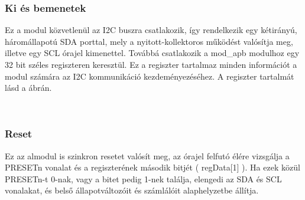 \subsubsection{Ki és bemenetek}
    Ez a modul közvetlenül az I2C buszra csatlakozik, így rendelkezik egy kétirányú, háromállapotú SDA porttal, mely a nyitott-kollektoros működést valósítja meg, illetve egy SCL órajel kimenettel. Továbbá csatlakozik a mod\_apb modulhoz egy 32 bit széles regiszteren keresztül. Ez a regiszter tartalmaz minden információt a modul számára az I2C kommunikáció kezdeményezéséhez. A regiszter tartalmát lásd a  ábrán.
    \begin{figure}[ht!]
        \centering
        \\[2ex]
        \caption{}
        \label{fig:reg}
    \end{figure}

\subsubsection{Reset}
    Ez az almodul is szinkron resetet valósít meg, az órajel felfutó élére vizsgálja a PRESETn vonalat és a regiszterének második bitjét ( regData[1] ). Ha ezek közül PRESETn-t 0-nak, vagy a bitet pedig 1-nek találja, elengedi az SDA és SCL vonalakat, és belső állapotváltozóit és számlálóit alaphelyzetbe állítja.

